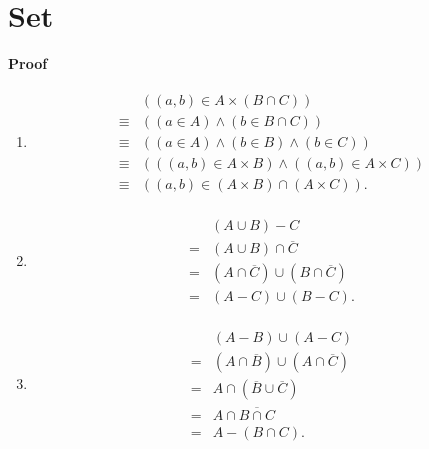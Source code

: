 \documentclass{../../cls/sig-alternate-05-2015}
\begin{document}
\section{Set}
\textbf{Proof}\begin{enumerate}[label=(\alph*)]
	\item \begin{align}
		\begin{aligned}
		& ((a, b) \in A \times (B \cap C))\\
		\equiv & ((a \in A) \land (b \in B \cap C))\\
		\equiv & ((a \in A) \land (b \in B) \land (b \in C))\\
		\equiv & (((a, b) \in A \times B) \land ((a, b) \in A \times C))\\
		\equiv & ((a, b) \in (A \times B) \cap (A \times C)).
		\end{aligned}
	\end{align}
	\item \begin{align}
		\begin{aligned}
		& (A \cup B) - C\\
		= & (A \cup B) \cap \overline{C}\\
		= & (A \cap \overline{C}) \cup (B \cap \overline{C})\\
		= & (A - C) \cup (B - C).
		\end{aligned}
	\end{align}
	\item \begin{align}
		\begin{aligned}
		& (A - B) \cup (A - C)\\
		= & (A \cap \overline{B}) \cup (A \cap \overline{C})\\
		= & A \cap (\overline{B} \cup \overline{C})\\
		= & A \cap \overline{B \cap C}\\
		= & A - (B \cap C).
		\end{aligned}
	\end{align}
\end{enumerate}
\end{document}
